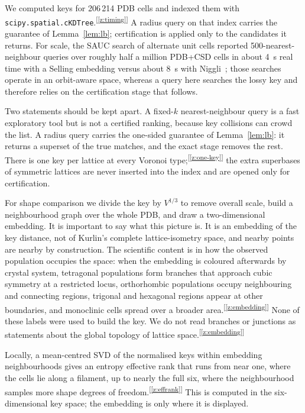 \documentclass[11pt]{article}
\newcommand{\chk}[1]{\textsuperscript{[\ref{#1}]}}
\begin{document}
We computed keys for 206\,214 PDB cells and indexed them with \texttt{scipy.spatial.cKDTree}.\chk{z:timing} A radius query on that index carries the guarantee of Lemma~\ref{lem:lb}; certification is applied only to the candidates it returns. For scale, the SAUC search of alternate unit cells reported 500-nearest-neighbour queries over roughly half a million PDB+CSD cells in about \SI{4}{\second} real time with a Selling embedding versus about \SI{8}{\second} with Niggli~\cite{mcgill2014}; those searches operate in an orbit-aware space, whereas a query here searches the lossy key and therefore relies on the certification stage that follows.

Two statements should be kept apart. A fixed-$k$ nearest-neighbour query is a fast exploratory tool but is not a certified ranking, because key collisions can crowd the list. A radius query carries the one-sided guarantee of Lemma~\ref{lem:lb}: it returns a superset of the true matches, and the exact stage removes the rest. There is one key per lattice at every Voronoi type;\chk{z:one-key} the extra superbases of symmetric lattices are never inserted into the index and are opened only for certification.

For shape comparison we divide the key by $V^{1/3}$ to remove overall scale, build a neighbourhood graph over the whole PDB, and draw a two-dimensional embedding. It is important to say what this picture is. It is an embedding of the key distance, not of Kurlin's complete lattice-isometry space, and nearby points are nearby by construction. The scientific content is in how the observed population occupies the space: when the embedding is coloured afterwards by crystal system, tetragonal populations form branches that approach cubic symmetry at a restricted locus, orthorhombic populations occupy neighbouring and connecting regions, trigonal and hexagonal regions appear at other boundaries, and monoclinic cells spread over a broader area.\chk{z:embedding} None of these labels were used to build the key. We do not read branches or junctions as statements about the global topology of lattice space.\chk{z:embedding}

Locally, a mean-centred SVD of the normalised keys within embedding neighbourhoods gives an entropy effective rank that runs from near one, where the cells lie along a filament, up to nearly the full six, where the neighbourhood samples more shape degrees of freedom.\chk{z:effrank} This is computed in the six-dimensional key space; the embedding is only where it is displayed.
\end{document}
